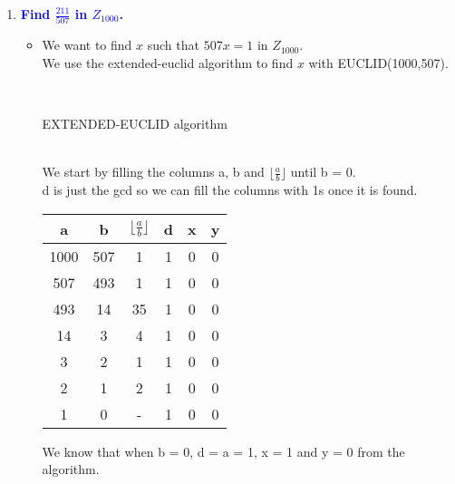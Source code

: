 \documentclass[11pt]{article}
\begin{document}
\begin{enumerate}
\item \textbf{\textcolor{blue}{Find $\frac{211}{507}$ in $Z_{1000}$.}}
    \begin{itemize}
        \item We want to find $x$ such that $507x = 1$ in $Z_{1000}$.
            \\ We use the extended-euclid algorithm to find $x$ with EUCLID(1000,507).
            \begin{algorithm}
            \Indm{}\\
            \Indp
            \caption{EXTENDED-EUCLID algorithm}
            \end{algorithm}
            \\ We start by filling the columns a, b and ${\lfloor}\frac{a}{b}{\rfloor}$ until b = 0.
            \\ d is just the gcd so we can fill the columns with 1s once it is found. \\
            \begin{center}
            \begin{tabular}{| c | c | c | c | c | c |} 
            \hline
            a & b & ${\lfloor}\frac{a}{b}{\rfloor}$ & d & x & y \\
            \hline
            1000 & 507 & 1 & 1 & 0 & 0 \\
            507 & 493 & 1 & 1 & 0 & 0 \\
            493 & 14 & 35 & 1 & 0 & 0 \\
            14 & 3 & 4 & 1 & 0 & 0 \\
            3 & 2 & 1 & 1 & 0 & 0 \\
            2 & 1 & 2 & 1 & 0 & 0 \\
            1 & 0 & - & 1 & 0 & 0 \\
            \hline
            \end{tabular}
            \end{center}
            We know that when b = 0, d = a = 1, x = 1 and y = 0 from the algorithm. \\

\end{itemize}
\end{enumerate}
\end{document}
